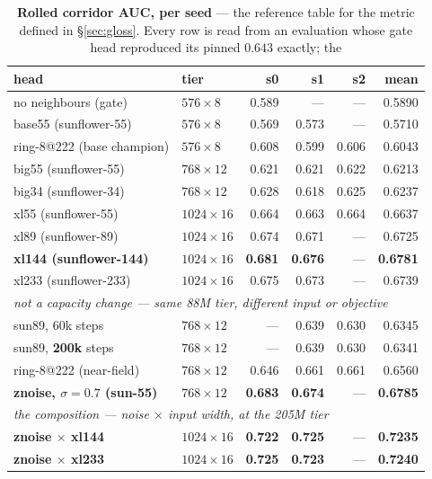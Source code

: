 \documentclass[10pt]{article}
\begin{document}
\begin{table}[htbp]
\centering\small
\begin{tabular}{llrrrr}
\toprule
head & tier & s0 & s1 & s2 & mean \\
\midrule
no neighbours (gate) & $576\times8$ & 0.589 & --- & --- & 0.5890 \\
base55 (sunflower-55) & $576\times8$ & 0.569 & 0.573 & --- & 0.5710 \\
ring-8@222 (base champion) & $576\times8$ & 0.608 & 0.599 & 0.606 & 0.6043 \\
big55 (sunflower-55) & $768\times12$ & 0.621 & 0.621 & 0.622 & 0.6213 \\
big34 (sunflower-34) & $768\times12$ & 0.628 & 0.618 & 0.625 & 0.6237 \\
xl55 (sunflower-55) & $1024\times16$ & 0.664 & 0.663 & 0.664 & 0.6637 \\
xl89 (sunflower-89) & $1024\times16$ & 0.674 & 0.671 & --- & 0.6725 \\
\textbf{xl144 (sunflower-144)} & $1024\times16$ & \textbf{0.681} & \textbf{0.676} & --- & \textbf{0.6781} \\
xl233 (sunflower-233) & $1024\times16$ & 0.675 & 0.673 & --- & 0.6739 \\
\midrule
\multicolumn{6}{l}{\emph{not a capacity change --- same 88M tier, different input or objective}}\\
sun89, 60k steps & $768\times12$ & --- & 0.639 & 0.630 & 0.6345 \\
sun89, \textbf{200k} steps & $768\times12$ & --- & 0.639 & 0.630 & 0.6341 \\
ring-8@222 (near-field) & $768\times12$ & 0.646 & 0.661 & 0.661 & 0.6560 \\
\textbf{znoise, $\sigma{=}0.7$ (sun-55)} & $768\times12$ & \textbf{0.683} & \textbf{0.674} & --- & \textbf{0.6785} \\
\midrule
\multicolumn{6}{l}{\emph{the composition --- noise $\times$ input width, at the 205M tier}}\\
\textbf{znoise $\times$ xl144} & $1024\times16$ & \textbf{0.722} & \textbf{0.725} & --- & \textbf{0.7235} \\
\textbf{znoise $\times$ xl233} & $1024\times16$ & \textbf{0.725} & \textbf{0.723} & --- & \textbf{0.7240} \\
\bottomrule
\end{tabular}
\caption{\textbf{Rolled corridor AUC, per seed} --- the reference table
for the metric defined in \S\ref{sec:gloss}. Every row is read from an
evaluation whose gate head reproduced its pinned $0.643$ exactly; the
}
\end{table}
\end{document}
